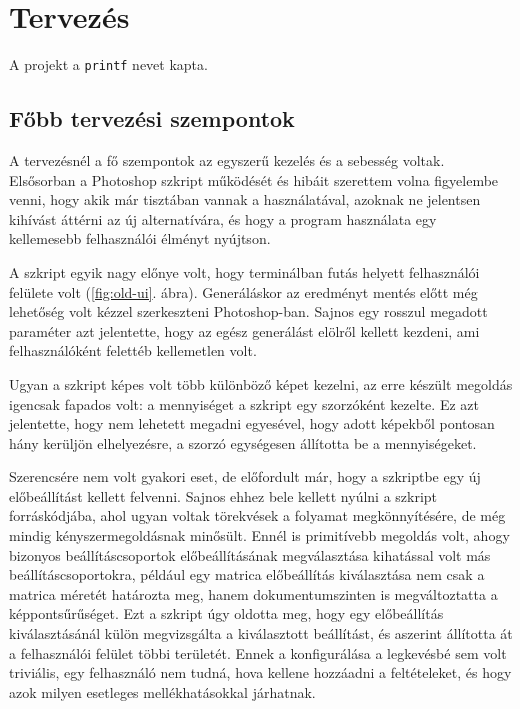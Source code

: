 \chapter{Tervezés}

A projekt a \texttt{printf} nevet kapta.

\section{Főbb tervezési szempontok}

A tervezésnél a fő szempontok az egyszerű kezelés és a sebesség voltak. Elsősorban a Photoshop szkript működését és hibáit szerettem volna figyelembe venni, hogy akik már tisztában vannak a használatával, azoknak ne jelentsen kihívást áttérni az új alternatívára, és hogy a program használata egy kellemesebb felhasználói élményt nyújtson. 

A szkript egyik nagy előnye volt, hogy terminálban futás helyett felhasználói felülete volt (\ref{fig:old-ui}. ábra). Generáláskor az eredményt mentés előtt még lehetőség volt kézzel szerkeszteni Photoshop-ban. Sajnos egy rosszul megadott paraméter azt jelentette, hogy az egész generálást elölről kellett kezdeni, ami felhasználóként felettéb kellemetlen volt. 

Ugyan a szkript képes volt több különböző képet kezelni, az erre készült megoldás igencsak fapados volt: a mennyiséget a szkript egy szorzóként kezelte. Ez azt jelentette, hogy nem lehetett megadni egyesével, hogy adott képekből pontosan hány kerüljön elhelyezésre, a szorzó egységesen állította be a mennyiségeket.

Szerencsére nem volt gyakori eset, de előfordult már, hogy a szkriptbe egy új előbeállítást kellett felvenni. Sajnos ehhez bele kellett nyúlni a szkript forráskódjába, ahol ugyan voltak törekvések a folyamat megkönnyítésére, de még mindig kényszermegoldásnak minősült.
Ennél is primitívebb megoldás volt, ahogy bizonyos beállításcsoportok előbeállításának megválasztása kihatással volt más beállításcsoportokra, például egy matrica előbeállítás kiválasztása nem csak a matrica méretét határozta meg, hanem dokumentumszinten is megváltoztatta a képpontsűrűséget. 
Ezt a szkript úgy oldotta meg, hogy egy előbeállítás kiválasztásánál külön megvizsgálta a kiválasztott beállítást, és aszerint állította át a felhasználói felület többi területét. Ennek a konfigurálása a legkevésbé sem volt triviális, egy felhasználó nem tudná, hova kellene hozzáadni a feltételeket, és hogy azok milyen esetleges mellékhatásokkal járhatnak. 

